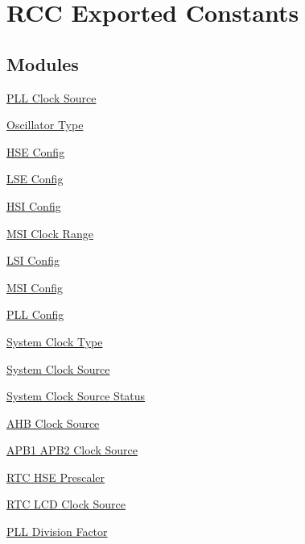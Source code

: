 \hypertarget{group___r_c_c___exported___constants}{\section{R\-C\-C Exported Constants}
\label{group___r_c_c___exported___constants}
}
\subsection*{Modules}
\begin{DoxyCompactItemize}
\item 
\hyperlink{group___r_c_c___p_l_l___clock___source}{P\-L\-L Clock Source}
\item 
\hyperlink{group___r_c_c___oscillator___type}{Oscillator Type}
\item 
\hyperlink{group___r_c_c___h_s_e___config}{H\-S\-E Config}
\item 
\hyperlink{group___r_c_c___l_s_e___config}{L\-S\-E Config}
\item 
\hyperlink{group___r_c_c___h_s_i___config}{H\-S\-I Config}
\item 
\hyperlink{group___r_c_c___m_s_i___clock___range}{M\-S\-I Clock Range}
\item 
\hyperlink{group___r_c_c___l_s_i___config}{L\-S\-I Config}
\item 
\hyperlink{group___r_c_c___m_s_i___config}{M\-S\-I Config}
\item 
\hyperlink{group___r_c_c___p_l_l___config}{P\-L\-L Config}
\item 
\hyperlink{group___r_c_c___system___clock___type}{System Clock Type}
\item 
\hyperlink{group___r_c_c___system___clock___source}{System Clock Source}
\item 
\hyperlink{group___r_c_c___system___clock___source___status}{System Clock Source Status}
\item 
\hyperlink{group___r_c_c___a_h_b___clock___source}{A\-H\-B Clock Source}
\item 
\hyperlink{group___r_c_c___a_p_b1___a_p_b2___clock___source}{A\-P\-B1 A\-P\-B2 Clock Source}
\item 
\hyperlink{group___r_c_c___h_a_l___e_c___r_t_c___h_s_e___d_i_v}{R\-T\-C H\-S\-E Prescaler}
\item 
\hyperlink{group___r_c_c___r_t_c___l_c_d___clock___source}{R\-T\-C L\-C\-D Clock Source}
\item 
\hyperlink{group___r_c_c___p_l_l___division___factor}{P\-L\-L Division Factor}

\end{DoxyCompactItemize}
